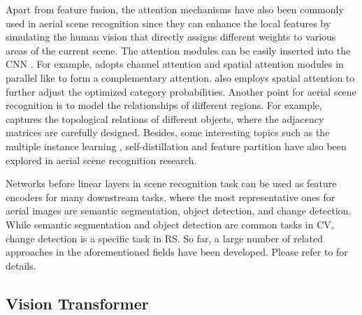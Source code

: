\documentclass[10pt, journal,twoside]{IEEEtran}
\begin{document}
 Apart from feature fusion, the attention mechanisms have also been commonly used in aerial scene recognition since they can enhance the local features by simulating the human vision that directly assigns different weights to various areas of the current scene. The attention modules can be easily inserted into the CNN \cite{ma2020auto}. For example, \cite{mblanet_2021_asr} adopts channel attention and spatial attention modules in parallel like \cite{cbam} to form a complementary attention. \cite{lse_2021_asr} also employs spatial attention to further adjust the optimized category probabilities. Another point for aerial scene recognition is to model the relationships of different regions. For example, \cite{xu2021_dfagcn} captures the topological relations of different objects, where the adjacency matrices are carefully designed. Besides, some interesting topics such as the multiple instance learning \cite{midcnet_bi2020multiple_asr}, self-distillation \cite{ESDMBENet_2021_asr} and feature partition \cite{mgmlnet_asr_2021_featurepartioning} have also been explored in aerial scene recognition research.

 Networks before linear layers in scene recognition task can be used as feature encoders for many downstream tasks, where the most representative ones for aerial images are semantic segmentation, object detection, and change detection. While semantic segmentation and object detection are common tasks in CV, change detection is a specific task in RS. So far, a large number of related approaches in the aforementioned fields have been developed. Please refer to \cite{rs_review1,rs_review2,rs_review3,rs_review4} for details.


 \subsection{Vision Transformer}
\end{document}
